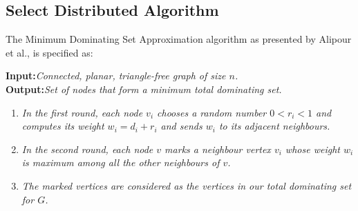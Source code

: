
\subsection{Select Distributed Algorithm}\label{subsec:algorithm}
\vspace{-1.5em}
The Minimum Dominating Set Approximation algorithm as presented by Alipour et al., is specified as:

\textbf{Input:}\textit{Connected, planar, triangle-free graph of size $n$.}\\
\textbf{Output:}\textit{Set of nodes that form a minimum total dominating set.}\\
\vspace{-1.5em}
\begin{enumerate}[noitemsep]
\itemsep-1.5em
\item \textit{In the first round, each node $v_i$ chooses a random number $0<r_i<1$ and computes its weight $w_i=d_i+r_i$ and sends $w_i$ to its adjacent neighbours.}\\
\item \textit{In the second round, each node $v$ marks a neighbour vertex $v_i$ whose weight $w_i$ is maximum among all the other neighbours of $v$.}\\
\vspace{1em}
\item \textit{The marked vertices are considered as the vertices in our total dominating set for $G$.}
\end{enumerate}
